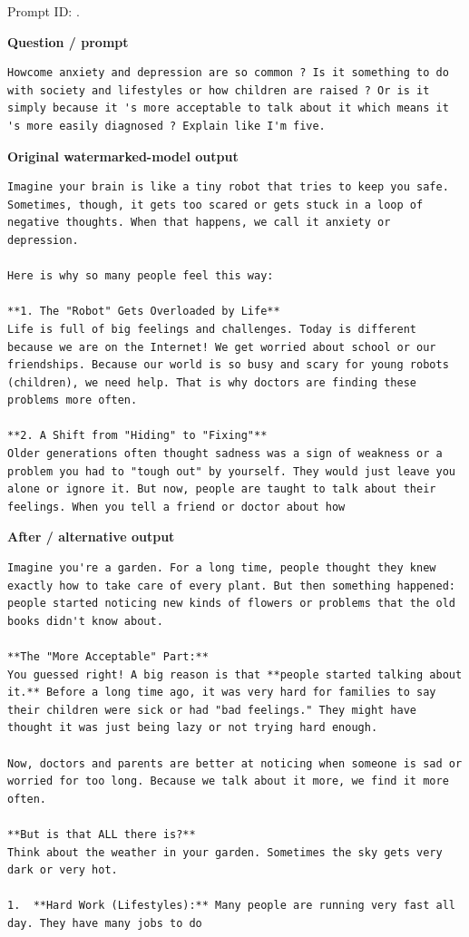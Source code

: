 Prompt ID:
\texttt{}.

\textbf{Question / prompt}

\begin{Verbatim}
Howcome anxiety and depression are so common ? Is it something to do with society and lifestyles or how children are raised ? Or is it simply because it 's more acceptable to talk about it which means it 's more easily diagnosed ? Explain like I'm five.
\end{Verbatim}

\textbf{Original watermarked-model output}

\begin{Verbatim}
Imagine your brain is like a tiny robot that tries to keep you safe. Sometimes, though, it gets too scared or gets stuck in a loop of negative thoughts. When that happens, we call it anxiety or depression.

Here is why so many people feel this way:

**1. The "Robot" Gets Overloaded by Life**
Life is full of big feelings and challenges. Today is different because we are on the Internet! We get worried about school or our friendships. Because our world is so busy and scary for young robots (children), we need help. That is why doctors are finding these problems more often.

**2. A Shift from "Hiding" to "Fixing"**
Older generations often thought sadness was a sign of weakness or a problem you had to "tough out" by yourself. They would just leave you alone or ignore it. But now, people are taught to talk about their feelings. When you tell a friend or doctor about how
\end{Verbatim}

\textbf{After / alternative output}

\begin{Verbatim}
Imagine you're a garden. For a long time, people thought they knew exactly how to take care of every plant. But then something happened: people started noticing new kinds of flowers or problems that the old books didn't know about.

**The "More Acceptable" Part:**
You guessed right! A big reason is that **people started talking about it.** Before a long time ago, it was very hard for families to say their children were sick or had "bad feelings." They might have thought it was just being lazy or not trying hard enough.

Now, doctors and parents are better at noticing when someone is sad or worried for too long. Because we talk about it more, we find it more often.

**But is that ALL there is?**
Think about the weather in your garden. Sometimes the sky gets very dark or very hot.

1.  **Hard Work (Lifestyles):** Many people are running very fast all day. They have many jobs to do
\end{Verbatim}

